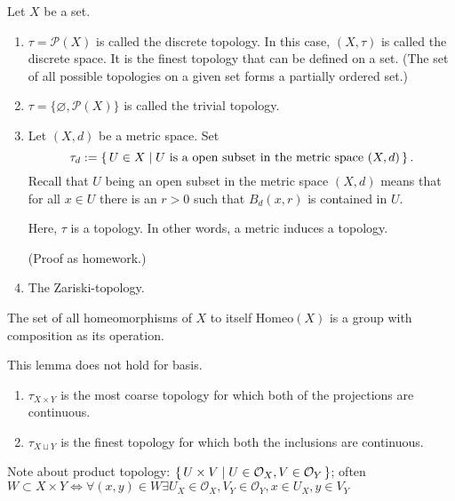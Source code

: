 \begin{example}
    Let \(X\) be a {\color{mathif}set}.
    \begin{enumerate}
        \item \(\tau = \mathcal{P}(X)\) is called the {\color{maththen}discrete topology}. In this case, \((X, \tau)\) is called the {\color{maththen}discrete space}. It is the {\color{mathrem}finest topology} that can be defined on a set. (The set of all possible topologies on a given set forms a partially ordered set.)
        \item \(\tau = \{\varnothing, \mathcal{P}(X)\}\) is called the {\color{maththen}trivial topology}.
        \item Let \((X, d)\) be a {\color{mathif}metric space}. Set
        \begin{equation}
            \tau_d := \left\{\, U \in X \mid U \text{ is a open subset in the metric space } (X, d) \,\right\} \text{.}
        \end{equation}
        Recall that \(U\) being an open subset in the metric space \((X, d)\) means that for all \(x \in U\) there is an \(r > 0\) such that \(B_d(x, r)\) is contained in \(U\).

        Here, \(\tau\) is a topology. In other words, a metric induces a topology.

        (Proof as homework.)
        \item The Zariski-topology.
    \end{enumerate}
\end{example}


\begin{remark}
    The set of all homeomorphisms of \(X\) to itself \(\mathrm{Homeo}(X)\) is a group with composition as its operation.
\end{remark}

\begin{remark}
    This lemma does not hold for basis.
\end{remark}


\begin{remark}
    \begin{enumerate}
        \item \(\tau_{X \times Y}\) is the most coarse topology for which both of the projections are continuous.
        \item \(\tau_{X \sqcup Y}\) is the finest topology for which both the inclusions are continuous.
    \end{enumerate}
\end{remark}

    Note about product topology: \(\left\{\, U \times V \mid U \in \mathcal{O}_X, V \in \mathcal{O}_Y \,\right\}\); often \(W \subset X \times Y \iff \forall (x, y) \in W \exists U_X \in \mathcal{O}_X, V_Y \in \mathcal{O}_Y, x \in U_X, y \in V_Y\)